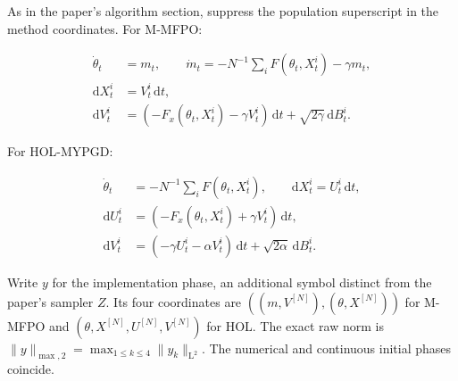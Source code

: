 \documentclass[11pt,a4paper]{report}
\begin{document}
As in the paper’s algorithm section, suppress the population superscript in the method coordinates. For M-MFPO:





\[\begin{aligned}\dot\theta_t&=m_t,\qquad\dot m_t=-N^{-1}\sum_i F(\theta_t,X_t^i)-\gamma m_t,\\\mathrm dX_t^i&=V_t^i\,\mathrm dt,\\\mathrm dV_t^i&=(-F_x(\theta_t,X_t^i)-\gamma V_t^i)\,\mathrm dt+\sqrt{2\gamma}\,\mathrm dB_t^i.\end{aligned}\]





For HOL-MYPGD:





\[\begin{aligned}\dot\theta_t&=-N^{-1}\sum_iF(\theta_t,X_t^i),\qquad\mathrm dX_t^i=U_t^i\,\mathrm dt,\\\mathrm dU_t^i&=(-F_x(\theta_t,X_t^i)+\gamma V_t^i)\,\mathrm dt,\\\mathrm dV_t^i&=(-\gamma U_t^i-\alpha V_t^i)\,\mathrm dt+\sqrt{2\alpha}\,\mathrm dB_t^i.\end{aligned}\]





Write \(y\) for the implementation phase, an additional symbol distinct from the paper’s sampler \(Z\). Its four coordinates are \(((m,V^{[N]}),(\theta,X^{[N]}))\) for M-MFPO and \((\theta,X^{[N]},U^{[N]},V^{[N]})\) for HOL. The exact raw norm is \(\|y\|_{\max,2}=\max_{1\le k\le4}\|y_k\|_{\mathrm L^2}\). The numerical and continuous initial phases coincide.
\end{document}
